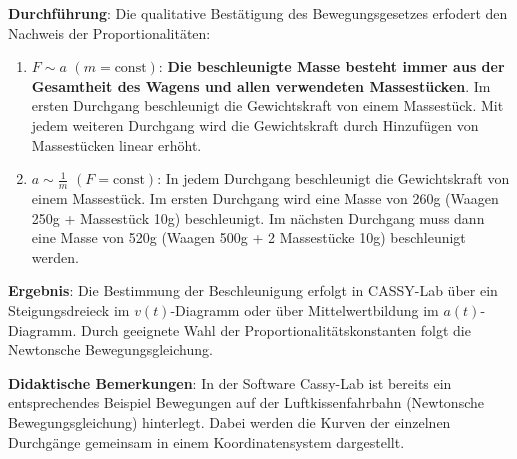 \documentclass[../main.tex]{subfiles}
\begin{document}
\begin{tcolorbox}
    \vspace{0.3cm} 
    \textbf{Durchführung}: Die qualitative Bestätigung des Bewegungsgesetzes erfodert den Nachweis der Proportionalitäten:
    \begin{enumerate}
        \item $F \sim a$ $(m=\text{const})$: \textbf{Die beschleunigte Masse besteht immer aus der Gesamtheit des Wagens und allen verwendeten Massestücken}. Im ersten Durchgang beschleunigt die Gewichtskraft von einem Massestück. Mit jedem weiteren Durchgang wird die Gewichtskraft durch Hinzufügen von Massestücken linear erhöht. 
        \item $a \sim \frac{1}{m}$ $(F=\text{const})$: In jedem Durchgang beschleunigt die Gewichtskraft von einem Massestück. Im ersten Durchgang wird eine Masse von 260g (Waagen 250g + Massestück 10g) beschleunigt. Im nächsten Durchgang muss dann eine Masse von 520g (Waagen 500g + 2 Massestücke 10g) beschleunigt werden.  
    \end{enumerate}

    \vspace{0.3cm}
    \textbf{Ergebnis}: Die Bestimmung der Beschleunigung erfolgt in CASSY-Lab über ein Steigungsdreieck im $v(t)$-Diagramm oder über Mittelwertbildung im $a(t)$-Diagramm. Durch geeignete Wahl der Proportionalitätskonstanten folgt die Newtonsche Bewegungsgleichung. 

    \vspace{0.3cm}
    \textbf{Didaktische Bemerkungen}: In der Software Cassy-Lab ist bereits ein entsprechendes Beispiel \glqq Bewegungen auf der Luftkissenfahrbahn (Newtonsche Bewegungsgleichung)\grqq{} hinterlegt. Dabei werden die Kurven der einzelnen Durchgänge gemeinsam in einem Koordinatensystem dargestellt.     

\end{tcolorbox}
\end{document}
